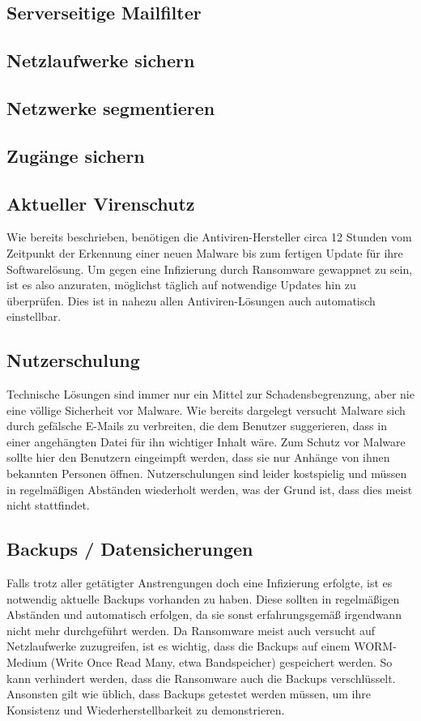 \subsection{Serverseitige Mailfilter}

	
\subsection{Netzlaufwerke sichern}
\subsection{Netzwerke segmentieren}
\subsection{Zugänge sichern}
\subsection{Aktueller Virenschutz}

	Wie bereits beschrieben, benötigen die Antiviren-Hersteller circa 12 Stunden vom Zeitpunkt der Erkennung einer neuen Malware bis zum fertigen Update für ihre Softwarelösung. Um gegen eine Infizierung durch Ransomware gewappnet zu sein, ist es also anzuraten, möglichst täglich auf notwendige Updates hin zu überprüfen. Dies ist in nahezu allen Antiviren-Lösungen auch automatisch einstellbar.

\subsection{Nutzerschulung}

	Technische Lösungen sind immer nur ein Mittel zur Schadensbegrenzung, aber nie eine völlige Sicherheit vor Malware. Wie bereits dargelegt versucht Malware sich durch gefälsche E-Mails zu verbreiten, die dem Benutzer suggerieren, dass in einer angehängten Datei für ihn wichtiger Inhalt wäre. Zum Schutz vor Malware sollte hier den Benutzern eingeimpft werden, dass sie nur Anhänge von ihnen bekannten Personen öffnen. Nutzerschulungen sind leider kostspielig und müssen in regelmäßigen Abständen wiederholt werden, was der Grund ist, dass dies meist nicht stattfindet.


\subsection{Backups / Datensicherungen}

	Falls trotz aller getätigter Anstrengungen doch eine Infizierung erfolgte, ist es notwendig aktuelle Backups vorhanden zu haben. Diese sollten in regelmäßigen Abständen und automatisch erfolgen, da sie sonst erfahrungsgemäß irgendwann nicht mehr durchgeführt werden. Da Ransomware meist auch versucht auf Netzlaufwerke zuzugreifen, ist es wichtig, dass die Backups auf einem WORM-Medium (Write Once Read Many, etwa Bandspeicher) gespeichert werden. So kann verhindert werden, dass die Ransomware auch die Backups verschlüsselt.\\
	Ansonsten gilt wie üblich, dass Backups getestet werden müssen, um ihre Konsistenz und Wiederherstellbarkeit zu demonstrieren.
	
